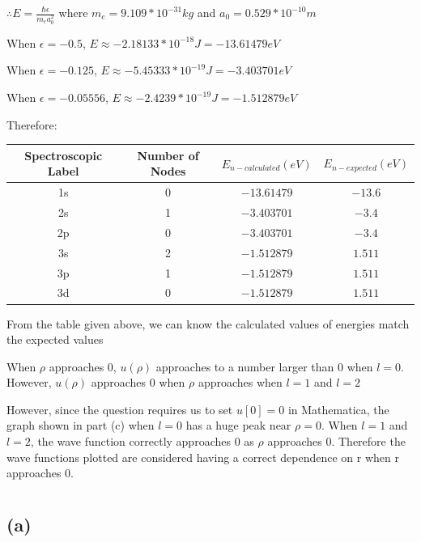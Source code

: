\documentclass[12pt]{article}
\begin{document}
\begin{spacing}{2.0}
$\therefore E=\frac{\hbar \epsilon}{m_e a_0^2}$ where $m_e=9.109*10^{-31} kg$ and $a_0=0.529*10^{-10} m$

When $\epsilon=-0.5$, $E \approx -2.18133*10^{-18}J = -13.61479 eV$

When $\epsilon=-0.125$, $E \approx -5.45333*10^{-19}J = -3.403701 eV$

When $\epsilon=-0.05556$, $E \approx -2.4239*10^{-19}J = -1.512879 eV$

Therefore:

\begin{tabular}{|c|c|c|c|}
  \hline
  Spectroscopic Label & Number of Nodes & $E_{n-calculated} (eV)$ & $E_{n-expected} (eV)$ \\
  \hline
  1s & 0 & $-13.61479$ & $-13.6$ \\
  \hline
  2s & 1 & $-3.403701$ & $-3.4$ \\
  \hline
  2p & 0 & $-3.403701$ & $-3.4$ \\
  \hline
  3s & 2 & $-1.512879$ & $1.511$ \\
  \hline
  3p & 1 & $-1.512879$ & $1.511$ \\
  \hline
  3d & 0 & $-1.512879$ & $1.511$ \\
  \hline
\end{tabular}

From the table given above, we can know the calculated values of energies match the expected values

When $\rho$ approaches 0, $u(\rho)$ approaches to a number larger than 0 when $l=0$. However, $u(\rho)$ approaches 0 when $\rho$ approaches when $l=1$ and $l=2$

However, since the question requires us to set $u[0]=0$ in Mathematica, the graph shown in part (c) when $l=0$ has a huge peak near $\rho=0$. When $l=1$ and $l=2$, the wave function correctly approaches 0 as $\rho$ approaches 0. Therefore the wave functions plotted are considered having a correct dependence on r when r approaches 0.

\section{} %

\subsection*{(a)}


\end{spacing}
\end{document}
